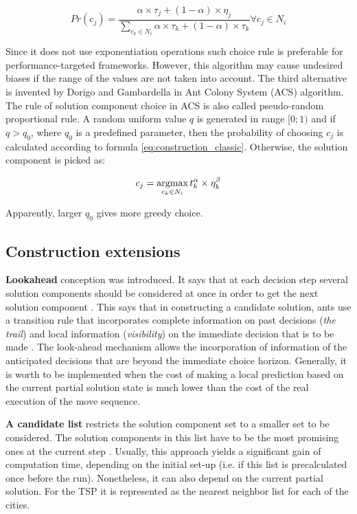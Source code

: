 \begin{equation}
Pr(c_j)=\frac{\alpha \times \tau_j + (1-\alpha) \times \eta_j}{\sum \limits_{c_k \in N_i} \alpha \times \tau_k + (1-\alpha) \times \tau_k} \forall c_j \in N_i
\end{equation}

Since it does not use exponentiation operations such choice rule is preferable for performance-targeted frameworks. However, this algorithm may cause undesired biases if the range of the values are not taken into account. The third alternative is invented by Dorigo and Gambardella \cite{dorigo} in Ant Colony System (ACS) algorithm. The rule of solution component choice in ACS is also called pseudo-random proportional rule. A random uniform value $q$ is generated in range $[0;1)$ and if $q>q_0$, where $q_0$ is a predefined parameter, then the probability of choosing $c_j$ is calculated according to formula \eqref{eq:construction_classic}. Otherwise, the solution component is picked as:

\begin{equation}
c_j = \operatornamewithlimits{argmax}\limits_{c_k \in N_i} t_k^\alpha \times \eta_k^\beta
\label{eq:construction_dorigo}
\end{equation}

Apparently, larger $q_0$ gives more greedy choice.

\subsection{Construction extensions}

\textbf{Lookahead} conception was introduced. It says that at each decision step several solution components should be considered at once in order to get the next solution component \cite{lookahead}. This says that in constructing a candidate solution, ants use a transition rule that incorporates complete information on past decisions (\emph{the trail}) and local information (\emph{visibility}) on the immediate decision that is to be made \cite{lookahead2}. The look-ahead mechanism allows the incorporation of information of the anticipated decisions that are beyond the immediate choice horizon. Generally, it is worth to be implemented when the cost of making a local prediction based on the current partial solution state is much lower than the cost of the real execution of the move sequence.

\textbf{A candidate list} restricts the solution component set to a smaller set to be considered. The solution components in this list have to be the most promising ones at the current step \cite{candidate_list}. Usually, this approach yields a significant gain of computation time, depending on the initial set-up (i.e. if this list is precalculated once before the run). Nonetheless, it can also depend on the current partial solution. For the TSP it is represented as the nearest neighbor list for each of the cities.

